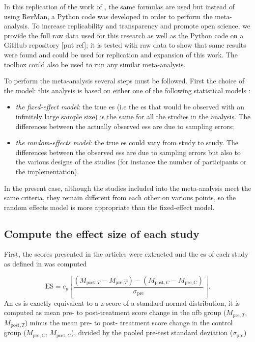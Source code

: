 \documentclass[12pt,a4paper,english]{article}
\begin{document}
In this replication of the work of \citeauthor{Cortese2016}, the same formulas are used \citep{Borenstein2009} but instead of using RevMan, 
a Python code was developed in order to perform the meta-analysis. To increase replicability and transparency and promote open science, we 
provide the full raw data used for this research as well as the Python code on a GitHub repository [put ref]; it is tested
with \citet{Cortese2016} raw data to show that same results were found and could be used for replication and expansion of this work. The toolbox
could also be used to run any similar meta-analysis. 

To perform the meta-analysis several steps must be followed. First the choice of the model: this analysis is based on either one of the following 
statistical models \citep{Borenstein2009}:
\begin{itemize}
    \item \emph{the fixed-effect model}: the true \gls{es} (i.e the \gls{es} that would be observed with an infinitely 
		large sample size) is the same for all the studies in the analysis. The differences between the actually observed \gls{es}s 
		are due to sampling errors;
    \item \emph{the random-effects model}: the true \gls{es} could vary from study to study. The differences between the observed
		\glspl{es} are due to sampling errors but also to the various designs of the studies (for instance the number of participants or the implementation).
\end{itemize}

In the present case, although the studies included into the meta-analysis meet the same criteria, they remain different from each other 
on various points, so the random effects model is more appropriate than the fixed-effect model.  

\subsection{Compute the effect size of each study}

First, the scores presented in the articles were extracted and the \gls{es} of each study as defined in \citet{Morris2008} 
was computed 

\begin{equation}
\label{eq:metareview_effect_size}
\text{ES} = c_p \left[ \frac{(M_{\text{post},T} - M_{\text{pre},T}) - (M_{\text{post},C} - M_{\text{pre},C}) }{\sigma_{\text{pre}}} \right ].
\end{equation} 
An \gls{es} is exactly equivalent to a z-score of a standard normal distribution, it is computed as mean pre- to post-treatment 
score change in the \gls{nfb} group ($M_{\text{pre},T}$, $M_{\text{post},T}$) minus the mean pre- to post- treatment score change 
in the control group ($M_{\text{pre},C}$, $M_{\text{post},C}$), divided by the pooled pre-test standard deviation ($\sigma_{\text{pre}}$) 
\end{document}
